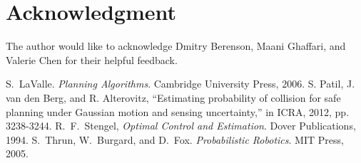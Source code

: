 \documentclass[journal]{IEEEtran}
\begin{document}




\section*{Acknowledgment}
The author would like to acknowledge Dmitry Berenson, Maani Ghaffari, and Valerie Chen for their helpful feedback.

\ifCLASSOPTIONcaptionsoff
  \newpage
\fi





%
%
%
\begin{thebibliography}{1}


 S.~LaValle. \emph{Planning Algorithms}. Cambridge University Press, 2006.
 S. Patil, J. van den Berg, and R. Alterovitz, “Estimating probability of collision for safe planning under Gaussian motion and sensing uncertainty,” in ICRA, 2012, pp. 3238-3244.
 R.~F.~Stengel, \emph{Optimal Control and Estimation}. Dover Publications, 1994.
 S.~Thrun, W.~Burgard, and D.~Fox. \emph{Probabilistic Robotics}. MIT Press, 2005.

\end{thebibliography}
\end{document}
